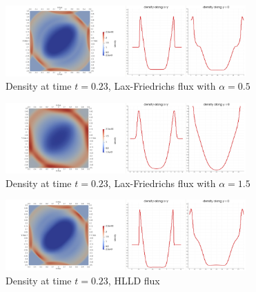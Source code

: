 	
	\begin{figure}[H]
		\begin{center}
			\includegraphics[width=0.82\textwidth]{img/numflux/lf3.jpg}
			\vspace{-3mm}
		\caption{Density at time $t = 0.23$, Lax-Friedrichs flux with $\alpha = 0.5$}
		\end{center}
	\end{figure}\vspace{-5mm}
	\begin{figure}[H]
		\begin{center}
			\includegraphics[width=0.82\textwidth]{img/numflux/lfw3.jpg}
			\vspace{-3mm}
		\caption{Density at time $t = 0.23$, Lax-Friedrichs flux with $\alpha = 1.5$}
		\end{center}
	\end{figure}\vspace{-5mm}
	\begin{figure}[H]
		\begin{center}
			\includegraphics[width=0.82\textwidth]{img/numflux/hl3.jpg}
			\vspace{-3mm}
		\caption{Density at time $t = 0.23$, HLLD flux}
		\end{center}
	\end{figure}\vspace{-5mm}
	\newpage
	
